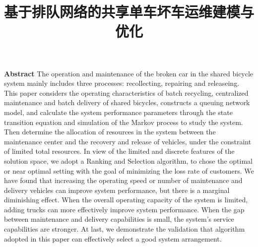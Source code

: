 \documentclass{article}
\title{基于排队网络的共享单车坏车运维建模与优化}
\begin{document}

\textbf{Abstract}
The operation and maintenance of the broken car in the shared bicycle system mainly includes three processes: recollecting, repairing and releaseing. This paper considers the operating characteristics of batch recycling, centralized maintenance and batch delivery of shared bicycles, constructs a queuing network model, and calculate the system performance parameters through the state transition equation and simulation of the Markov process to study the system. Then determine the allocation of resources in the system between the maintenance center and the recovery and release of vehicles, under the constraint of limited total resources. In view of the limited and discrete features of the solution space, we adopt a Ranking and Selection algorithm, to chose the optimal or near optimal setting with the goal of minimizing the loss rate of customers. We have found that increasing the operating speed or number of maintenance and delivery vehicles can improve system performance, but there is a marginal diminishing effect. When the overall operating capacity of the system is limited, adding trucks can more effectively improve system performance. When the gap between maintenance and delivery capabilities is small, the system's service capabilities are stronger. At last, we demonstrate the validation that algorithm adopted in this paper can effectively select a good system arrangement. \\

\end{document}

